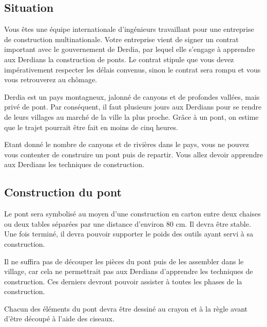 \documentclass[11pt,a4paper]{article}
\begin{document}
\subsection{Situation}

Vous êtes une équipe internationale d'ingénieurs travaillant pour une entreprise de construction multinationale.
Votre entreprise vient de signer un contrat important avec le gouvernement de Derdia, par lequel elle s'engage à apprendre aux Derdians la construction de ponts.
Le contrat stipule que vous devez impérativement respecter les délais convenus, sinon le contrat sera rompu et vous vous retrouverez au chômage.

Derdia est un pays montagneux, jalonné de canyons et de profondes vallées, mais privé de pont.
Par conséquent, il faut plusieurs jours aux Derdians pour se rendre de leurs villages au marché de la ville la plus proche. Grâce à un pont, on estime que le trajet pourrait être fait en moins de cinq heures.

Etant donné le nombre de canyons et de rivières dans le pays, vous ne pouvez vous contenter de construire un pont puis de repartir.
Vous allez devoir apprendre aux Derdians les techniques de construction.

\subsection{Construction du pont}

Le pont sera symbolisé au moyen d'une construction en carton entre deux chaises ou deux tables séparées par une distance d'environ 80 cm.
Il devra être stable. Une fois terminé, il devra pouvoir supporter le poids des outils ayant servi à sa construction.

Il ne suffira pas de découper les pièces du pont puis de les assembler dans le village, car cela ne permettrait pas aux Derdians d'apprendre les techniques de construction.
Ces derniers devront pouvoir assister à toutes les phases de la construction.

Chacun des éléments du pont devra être dessiné au crayon et à la règle avant d'être découpé à l'aide des ciseaux.
\end{document}
